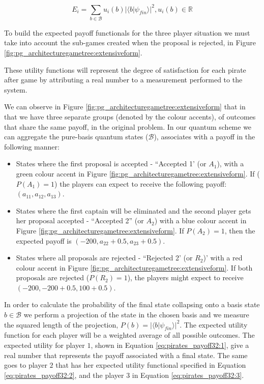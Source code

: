 \documentclass[10pt,twocolumn]{llncs}
\begin{document}
\begin{equation}
E_{i}=\sum_{b \in \mathcal{B}} u_{i}(b)\vert \langle b\vert \psi_{fin}\rangle\vert^{2}, u_{i}(b) \in \mathbb{R}
\label{eq:quantum_game_definition_payoff_func}
\end{equation}

To build the expected payoff functionals for the three player situation we must take into account the sub-games created when the proposal is rejected, in Figure \ref{fig:pg_architecturegametree:extensiveform}.


These utility functions will represent the degree of satisfaction for each pirate after game by attributing a real number to a measurement performed to the system.


We can observe in Figure \ref{fig:pg_architecturegametree:extensiveform} that in that we have three separate groups (denoted by the colour accents), of outcomes that share the same payoff, in the original problem. 
In our quantum scheme we can aggregate the pure-basis quantum states ($\mathcal{B}$), associates with a payoff in the following manner: 
\begin{itemize}
\item States where the first proposal is accepted - ``Accepted 1' (or $A_{1}$), with a green colour accent in Figure \ref{fig:pg_architecturegametree:extensiveform}. If ($P(A_{1})=1$) the players can expect to receive the following payoff: $(a_{11}, a_{12}, a_{13})$.

\item States where the first captain will be eliminated and the second player gets her proposal accepted  - ``Accepted 2'' (or $A_{2}$) with a blue colour accent in Figure \ref{fig:pg_architecturegametree:extensiveform}. If $P(A_{2})=1$, then the expected payoff is $(-200, a_{22}+0.5, a_{23}+0.5)$.

\item States where all proposals are rejected  - ``Rejected 2' (or $R_{2}$)' with a red colour accent in Figure \ref{fig:pg_architecturegametree:extensiveform}. If both proposals are rejected ($P(R_{2})= 1$), the players might expect to receive $(-200, -200+0.5, 100+0.5)$.

\end{itemize}

In order to calculate the probability of the final state collapsing onto a basis state $b \in \mathcal{B}$ we perform a projection of the state in the chosen basis and we measure the squared length of the projection, $P(b) = \vert\langle b\vert\psi_{fin}\rangle\vert^{2}$\cite{Trueblood}. The expected utility function for each player will be a weighted average of all possible outcomes. The expected utility for player $1$, shown in Equation \eqref{eq:pirates_payoff32:1}, give a real number that represents the payoff associated with a final state. The same goes to player $2$ that has her expected utility functional specified in Equation \eqref{eq:pirates_payoff32:2}, and the player $3$ in Equation \eqref{eq:pirates_payoff32:3}.
\end{document}
